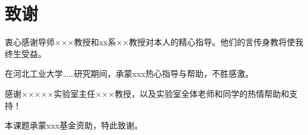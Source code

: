\chapter*{致谢}
衷心感谢导师×××教授和xx系××教授对本人的精心指导。他们的言传身教将使我终生受益。

在河北工业大学……研究期间，承蒙xxx热心指导与帮助，不胜感激。

感谢×××××实验室主任×××教授，以及实验室全体老师和同学的热情帮助和支持！

本课题承蒙xxx基金资助，特此致谢。